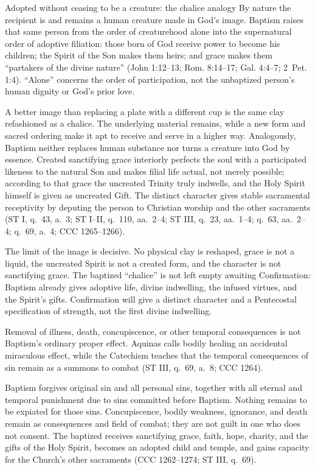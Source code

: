 \begin{studybox}{Adopted without ceasing to be a creature: the chalice analogy}
By nature the recipient is and remains a human creature made in God's image. Baptism raises that same person from the order of creaturehood alone into the supernatural order of adoptive filiation: those born of God receive power to become his children; the Spirit of the Son makes them heirs; and grace makes them ``partakers of the divine nature'' (John 1:12--13; Rom. 8:14--17; Gal. 4:4--7; 2~Pet. 1:4). ``Alone'' concerns the order of participation, not the unbaptized person's human dignity or God's prior love.

A better image than replacing a plate with a different cup is the same clay refashioned as a chalice. The underlying material remains, while a new form and sacred ordering make it apt to receive and serve in a higher way. Analogously, Baptism neither replaces human substance nor turns a creature into God by essence. Created sanctifying grace interiorly perfects the soul with a participated likeness to the natural Son and makes filial life actual, not merely possible; according to that grace the uncreated Trinity truly indwells, and the Holy Spirit himself is given as uncreated Gift. The distinct character gives stable sacramental receptivity by deputing the person to Christian worship and the other sacraments (ST I, q.~43, a.~3; ST I--II, q.~110, aa.~2--4; ST III, q.~23, aa.~1--4; q.~63, aa.~2--4; q.~69, a.~4; CCC 1265--1266).

The limit of the image is decisive. No physical clay is reshaped, grace is not a liquid, the uncreated Spirit is not a created form, and the character is not sanctifying grace. The baptized ``chalice'' is not left empty awaiting Confirmation: Baptism already gives adoptive life, divine indwelling, the infused virtues, and the Spirit's gifts. Confirmation will give a distinct character and a Pentecostal specification of strength, not the first divine indwelling.
\end{studybox}

Removal of illness, death, concupiscence, or other temporal consequences is not Baptism's ordinary proper effect. Aquinas calls bodily healing an accidental miraculous effect, while the Catechism teaches that the temporal consequences of sin remain as a summons to combat (ST III, q.~69, a.~8; CCC 1264).

Baptism forgives original sin and all personal sins, together with all eternal and temporal punishment due to sins committed before Baptism. Nothing remains to be expiated for those sins. Concupiscence, bodily weakness, ignorance, and death remain as consequences and field of combat; they are not guilt in one who does not consent. The baptized receives sanctifying grace, faith, hope, charity, and the gifts of the Holy Spirit, becomes an adopted child and temple, and gains capacity for the Church's other sacraments (CCC 1262--1274; ST III, q.~69).

